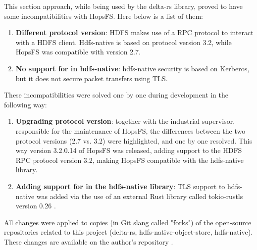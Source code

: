 
This section approach, while being used by the delta-rs library, proved to have some incompatibilities with \gls{HopsFS}. Here below is a list of them:
\begin{enumerate}
  \item \textbf{Different  protocol version}: \gls{HDFS} makes use of a \gls{RPC} protocol to interact with a \gls{HDFS} client. Hdfs-native is based on protocol version 3.2, while \gls{HopsFS} was compatible with version 2.7.
  \item \textbf{No support for  in hdfs-native}: hdfs-native security is based on Kerberos, but it does not secure packet transfers using \gls{TLS}.
\end{enumerate}
These incompatibilities were solved one by one during development in the following way:
\begin{enumerate}
  \item \textbf{Upgrading  protocol version}: together with the industrial supervisor, responsible for the maintenance of \gls{HopsFS}, the differences between the two protocol versions (2.7 vs. 3.2) were highlighted, and one by one resolved. This way version 3.2.0.14 of \gls{HopsFS} was released, adding support to the \gls{HDFS} \gls{RPC} protocol version 3.2, making \gls{HopsFS} compatible with the hdfs-native library.
  \item \textbf{Adding support for  in the hdfs-native library}: \gls{TLS} support to hdfs-native was added via the use of an external Rust library called tokio-rustls version 0.26 \cite{RustlsTokiorustlsAsync}.
\end{enumerate}

All changes were applied to copies (in Git slang called "forks") of the open-source repositories related to this project (delta-rs, hdfs-native-object-store, hdfs-native). These changes are available on the author's repository \cite{manfrediSilemoHdfsnative2024, manfrediSilemoHdfsnativeobjectstore2024, manfrediSilemoDeltars2024}.